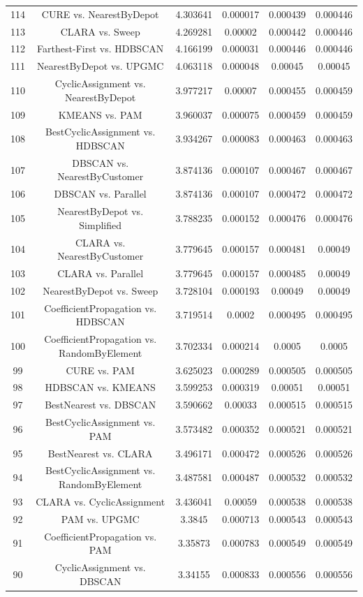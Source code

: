 \documentclass[a4paper,10pt]{article}
\begin{document}
\begin{landscape}
\begin{table}[!htp]
\begin{tabular}{cccccc}
114&CURE vs. NearestByDepot&4.303641&0.000017&0.000439&0.000446\\
113&CLARA vs. Sweep&4.269281&0.00002&0.000442&0.000446\\
112&Farthest-First vs. HDBSCAN&4.166199&0.000031&0.000446&0.000446\\
111&NearestByDepot vs. UPGMC&4.063118&0.000048&0.00045&0.00045\\
110&CyclicAssignment vs. NearestByDepot&3.977217&0.00007&0.000455&0.000459\\
109&KMEANS vs. PAM&3.960037&0.000075&0.000459&0.000459\\
108&BestCyclicAssignment vs. HDBSCAN&3.934267&0.000083&0.000463&0.000463\\
107&DBSCAN vs. NearestByCustomer&3.874136&0.000107&0.000467&0.000467\\
106&DBSCAN vs. Parallel&3.874136&0.000107&0.000472&0.000472\\
105&NearestByDepot vs. Simplified&3.788235&0.000152&0.000476&0.000476\\
104&CLARA vs. NearestByCustomer&3.779645&0.000157&0.000481&0.00049\\
103&CLARA vs. Parallel&3.779645&0.000157&0.000485&0.00049\\
102&NearestByDepot vs. Sweep&3.728104&0.000193&0.00049&0.00049\\
101&CoefficientPropagation vs. HDBSCAN&3.719514&0.0002&0.000495&0.000495\\
100&CoefficientPropagation vs. RandomByElement&3.702334&0.000214&0.0005&0.0005\\
99&CURE vs. PAM&3.625023&0.000289&0.000505&0.000505\\
98&HDBSCAN vs. KMEANS&3.599253&0.000319&0.00051&0.00051\\
97&BestNearest vs. DBSCAN&3.590662&0.00033&0.000515&0.000515\\
96&BestCyclicAssignment vs. PAM&3.573482&0.000352&0.000521&0.000521\\
95&BestNearest vs. CLARA&3.496171&0.000472&0.000526&0.000526\\
94&BestCyclicAssignment vs. RandomByElement&3.487581&0.000487&0.000532&0.000532\\
93&CLARA vs. CyclicAssignment&3.436041&0.00059&0.000538&0.000538\\
92&PAM vs. UPGMC&3.3845&0.000713&0.000543&0.000543\\
91&CoefficientPropagation vs. PAM&3.35873&0.000783&0.000549&0.000549\\
90&CyclicAssignment vs. DBSCAN&3.34155&0.000833&0.000556&0.000556\\

\end{tabular}
\end{table}
\end{landscape}
\end{document}
